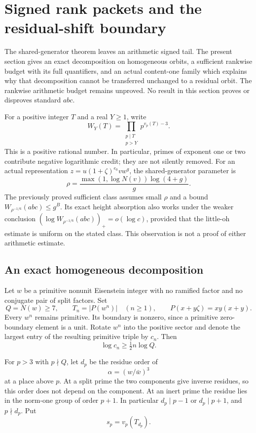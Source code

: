 \section{Signed rank packets and the residual-shift boundary}
\label{sec:aa2-rank-packets}
The shared-generator theorem leaves an arithmetic signed tail. The present
section gives an exact decomposition on homogeneous orbits, a sufficient
rankwise budget with its full quantifiers, and an actual content-one family
which explains why that decomposition cannot be transferred unchanged to a
residual orbit. The rankwise arithmetic budget remains unproved. No result in
this section proves or disproves standard $abc$.

For a positive integer $T$ and a real $Y\ge1$, write
\[
 W_Y(T)=\prod_{\substack{p\mid T\\p>Y}}p^{v_p(T)-3}.
\]
This is a positive rational number. In particular, primes of exponent one or
two contribute negative logarithmic credit; they are not silently removed.
For an actual representation $z=u(1+\zeta)^{e_0}vw^g$, the shared-generator
parameter is
\[
 \rho=\frac{\max(1,\log N(v))\log(4+g)}{g}.
\]
The previously proved sufficient class assumes small $\rho$ and a bound
$W_{\rho^{-1/6}}(abc)\le g^B$. Its exact height absorption also works under
the weaker conclusion $(\log W_{\rho^{-1/6}}(abc))_+=o(\log c)$, provided that
the little-oh estimate is uniform on the stated class. This observation is
not a proof of either arithmetic estimate.

\subsection{An exact homogeneous decomposition}
Let $w$ be a primitive nonunit Eisenstein integer with no ramified factor
and no conjugate pair of split factors. Set
\[
 Q=N(w)\ge7,\qquad T_n=|P(w^n)|\quad(n\ge1),
 \qquad P(x+y\zeta)=xy(x+y).
\]
Every $w^n$ remains primitive. Its boundary is nonzero, since a primitive
zero-boundary element is a unit. Rotate $w^n$ into the positive sector and
denote the largest entry of the resulting primitive triple by $c_n$. Then
\begin{equation}\label{eq:aa2-height}
 \log c_n\ge\tfrac12 n\log Q.
\end{equation}

For $p>3$ with $p\nmid Q$, let $d_p$ be the residue order of
\[
 \alpha=(w/\bar w)^3
\]
at a place above $p$. At a split prime the two components give inverse
residues, so this order does not depend on the component. At an inert prime
the residue lies in the norm-one group of order $p+1$. In particular
$d_p\mid p-1$ or $d_p\mid p+1$, and $p\nmid d_p$. Put
\[
 s_p=v_p(T_{d_p}).
\]

